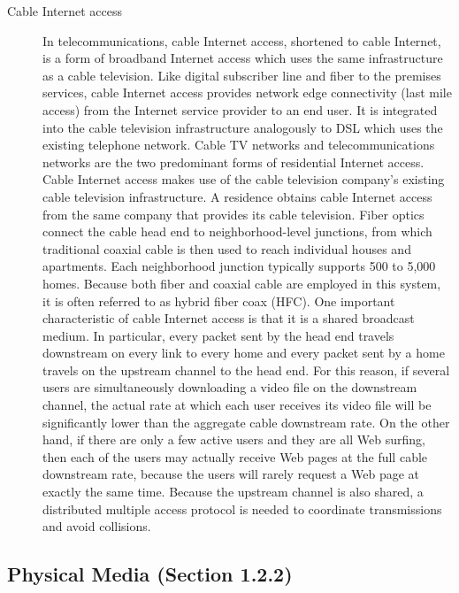 \documentclass{article}
\begin{document}
\begin{description}
    \item[Cable Internet access] In telecommunications, cable Internet access, shortened to cable Internet, is a form of broadband Internet access which uses the same infrastructure as a cable television. Like digital subscriber line and fiber to the premises services, cable Internet access provides network edge connectivity (last mile access) from the Internet service provider to an end user. It is integrated into the cable television infrastructure analogously to DSL which uses the existing telephone network. Cable TV networks and telecommunications networks are the two predominant forms of residential Internet access. Cable Internet access makes use of the cable television company’s existing cable
    television infrastructure. A residence obtains cable Internet access from the same
    company that provides its cable television. Fiber optics
    connect the cable head end to neighborhood-level junctions, from which traditional
    coaxial cable is then used to reach individual houses and apartments. Each
    neighborhood junction typically supports 500 to 5,000 homes. Because both fiber
    and coaxial cable are employed in this system, it is often referred to as hybrid
    fiber coax (HFC). One important characteristic of cable Internet access is that it is a shared
    broadcast medium. In particular, every packet sent by the head end travels downstream
    on every link to every home and every packet sent by a home travels on the
    upstream channel to the head end. For this reason, if several users are simultaneously
    downloading a video file on the downstream channel, the actual rate at which
    each user receives its video file will be significantly lower than the aggregate cable
    downstream rate. On the other hand, if there are only a few active users and they
    are all Web surfing, then each of the users may actually receive Web pages at the
    full cable downstream rate, because the users will rarely request a Web page at
    exactly the same time. Because the upstream channel is also shared, a distributed
    multiple access protocol is needed to coordinate transmissions and avoid collisions.
\end{description}

\subsection*{Physical Media (Section 1.2.2)}
\end{document}
